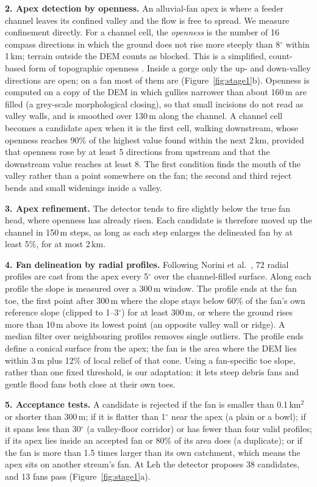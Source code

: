\documentclass[sigconf,nonacm]{acmart}
\begin{document}
\textbf{2. Apex detection by openness.} An alluvial-fan apex is where a feeder channel leaves its confined valley and the flow is free to spread. We measure confinement directly. For a channel cell, the \emph{openness} is the number of 16 compass directions in which the ground does not rise more steeply than 8$^\circ$ within 1\,km; terrain outside the DEM counts as blocked. This is a simplified, count-based form of topographic openness \cite{yokoyama2002}. Inside a gorge only the up- and down-valley directions are open; on a fan most of them are (Figure~\ref{fig:stage1}b). Openness is computed on a copy of the DEM in which gullies narrower than about 160\,m are filled (a grey-scale morphological closing), so that small incisions do not read as valley walls, and is smoothed over 130\,m along the channel. A channel cell becomes a candidate apex when it is the first cell, walking downstream, whose openness reaches 90\% of the highest value found within the next 2\,km, provided that openness rose by at least 5 directions from upstream and that the downstream value reaches at least 8. The first condition finds the mouth of the valley rather than a point somewhere on the fan; the second and third reject bends and small widenings inside a valley.

\textbf{3. Apex refinement.} The detector tends to fire slightly below the true fan head, where openness has already risen. Each candidate is therefore moved up the channel in 150\,m steps, as long as each step enlarges the delineated fan by at least 5\%, for at most 2\,km.

\textbf{4. Fan delineation by radial profiles.} Following Norini et al.\ \cite{norini2016}, 72 radial profiles are cast from the apex every 5$^\circ$ over the channel-filled surface. Along each profile the slope is measured over a 300\,m window. The profile ends at the fan toe, the first point after 300\,m where the slope stays below 60\% of the fan's own reference slope (clipped to 1--3$^\circ$) for at least 300\,m, or where the ground rises more than 10\,m above its lowest point (an opposite valley wall or ridge). A median filter over neighbouring profiles removes single outliers. The profile ends define a conical surface from the apex; the fan is the area where the DEM lies within 3\,m plus 12\% of local relief of that cone. Using a fan-specific toe slope, rather than one fixed threshold, is our adaptation: it lets steep debris fans and gentle flood fans both close at their own toes.

\textbf{5. Acceptance tests.} A candidate is rejected if the fan is smaller than 0.1\,km$^2$ or shorter than 300\,m; if it is flatter than 1$^\circ$ near the apex (a plain or a bowl); if it spans less than 30$^\circ$ (a valley-floor corridor) or has fewer than four valid profiles; if its apex lies inside an accepted fan or 80\% of its area does (a duplicate); or if the fan is more than 1.5 times larger than its own catchment, which means the apex sits on another stream's fan. At Leh the detector proposes 38 candidates, and 13 fans pass (Figure~\ref{fig:stage1}a).
\end{document}
